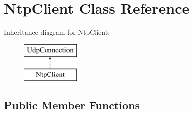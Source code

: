 \hypertarget{class_ntp_client}{}\section{Ntp\+Client Class Reference}
\label{class_ntp_client}
Inheritance diagram for Ntp\+Client\+:\begin{figure}[H]
\begin{center}
\leavevmode
\includegraphics[height=2.000000cm]{class_ntp_client}
\end{center}
\end{figure}
\subsection*{Public Member Functions}
